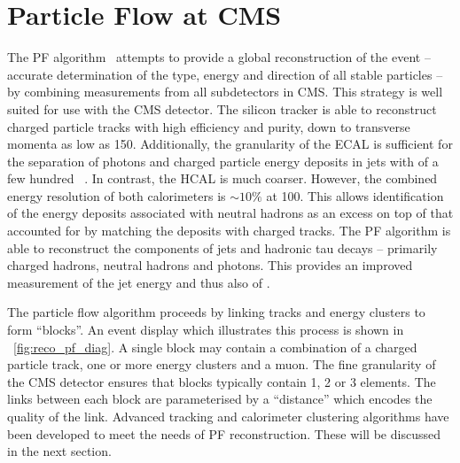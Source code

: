 \section{Particle Flow at \ac{CMS}}
\label{sec:reco_pf}
The \ac{PF} algorithm~\cite{cms_pf_pas, cms_pf_pas2} attempts to provide a
global reconstruction of the event -- accurate determination of the type, energy
and direction of all stable particles -- by combining measurements from all
subdetectors in \ac{CMS}. This strategy is well suited for use with the \ac{CMS}
detector. The silicon tracker is able to reconstruct charged particle tracks
with high efficiency and purity, down to transverse momenta as low as
\unit{150}{\MeV}. Additionally, the granularity of the \ac{ECAL} is sufficient
for the separation of photons and charged particle energy deposits in jets with
\Pt of a few hundred \GeV~\cite{cms_pf_pas}. In contrast, the \ac{HCAL} is much
coarser. However, the combined energy resolution of both calorimeters is $\sim
10\%$ at \unit{100}{\GeV}. This allows identification of the energy deposits
associated with neutral hadrons as an excess on top of that accounted for by
matching the deposits with charged tracks. The \ac{PF} algorithm is able to
reconstruct the components of jets and hadronic tau decays -- primarily charged
hadrons, neutral hadrons and photons. This provides an improved measurement of
the jet energy and thus also of \METv.

The particle flow algorithm proceeds by linking tracks and energy clusters to
form ``blocks''. An event display which illustrates this process is shown in
\fig~\ref{fig:reco_pf_diag}. A single block may contain a combination of a
charged particle track, one or more energy clusters and a muon. The fine
granularity of the \ac{CMS} detector ensures that blocks typically contain 1, 2
or 3 elements.  The links between each block are parameterised by a ``distance''
which encodes the quality of the link. Advanced tracking and calorimeter
clustering algorithms have been developed to meet the needs of \ac{PF}
reconstruction. These will be discussed in the next section.

